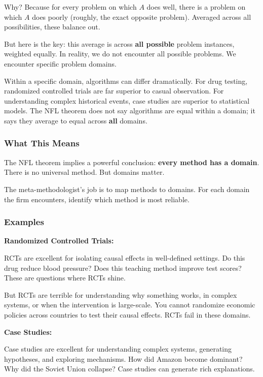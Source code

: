 \documentclass[11pt,letterpaper]{article}
\begin{document}
Why? Because for every problem on which $A$ does well, there is a problem on which $A$ does poorly (roughly, the exact opposite problem). Averaged across all possibilities, these balance out.

But here is the key: this average is across \textbf{all possible} problem instances, weighted equally. In reality, we do not encounter all possible problems. We encounter specific problem domains.

Within a specific domain, algorithms can differ dramatically. For drug testing, randomized controlled trials are far superior to casual observation. For understanding complex historical events, case studies are superior to statistical models. The NFL theorem does not say algorithms are equal within a domain; it says they average to equal across \textbf{all} domains.

\subsubsection*{What This Means}

The NFL theorem implies a powerful conclusion: \textbf{every method has a domain}. There is no universal method. But domains matter.

The meta-methodologist's job is to map methods to domains. For each domain the firm encounters, identify which method is most reliable.

\subsubsection*{Examples}

\textbf{Randomized Controlled Trials:}

RCTs are excellent for isolating causal effects in well-defined settings. Do this drug reduce blood pressure? Does this teaching method improve test scores? These are questions where RCTs shine.

But RCTs are terrible for understanding why something works, in complex systems, or when the intervention is large-scale. You cannot randomize economic policies across countries to test their causal effects. RCTs fail in these domains.

\textbf{Case Studies:}

Case studies are excellent for understanding complex systems, generating hypotheses, and exploring mechanisms. How did Amazon become dominant? Why did the Soviet Union collapse? Case studies can generate rich explanations.
\end{document}
